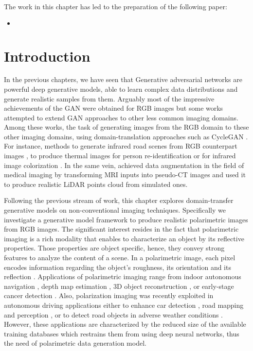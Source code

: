 \clearpage

The work in this chapter has led to the preparation of the following paper: 
\begin{itemize}
	\item {}
\end{itemize}

\setcounter{minitocdepth}{3}
\minitoc
\setcounter{minitocdepth}{2}

\section{Introduction}


In the previous chapters, we have seen that Generative  adversarial networks \citep{Goodfellow2014} are powerful deep generative models, able to learn complex data distributions and generate realistic samples from them. Arguably most of the impressive achievements of the \ac{GAN} were obtained for \ac{RGB} images but some works attempted to extend \ac{GAN} approaches to other less common imaging domains. Among these works, the task of generating images from the \ac{RGB} domain to these other imaging domains, using domain-translation approaches such as \ac{CycleGAN} \citep{Zhu2017a}. For instance, methods to generate infrared road scenes from \ac{RGB} counterpart images \citep{Zhang2018b}, to produce thermal images for person re-identification \citep{Kniaz2018} or for infrared image colorization \citep{Mehri2019}. In the same vein, \citet{Nie2017} achieved data augmentation in the field of medical imaging by transforming MRI inputs into pseudo-CT images and \citet{Sallab2019} used it to produce realistic \ac{LiDAR} points cloud from simulated ones. 

Following the previous stream of work, this chapter explores domain-transfer generative models on non-conventional imaging techniques. Specifically we investigate a  generative model framework to produce realistic polarimetric images from \ac{RGB} images.  The significant interest resides in the fact that polarimetric imaging is a rich modality that enables to characterize an object by its reflective properties. Those properties are object specific, hence, they convey strong features to analyze the content of a scene. In a polarimetric image, each pixel encodes information regarding the object's roughness, its orientation and its reflection \citep{Wolff1995}. Applications of polarimetric imaging range from indoor autonomous navigation \citep{Berger2017}, depth map estimation \citep{Zhu2019}, 3D object reconstruction \citep{Morel2006},  or early-stage cancer detection \citep{Rehbinder2016}. Also, polarization imaging was recently exploited in autonomous driving applications either to enhance car detection \citep{Fan2018}, road mapping and perception \citep{Aycock2017}, or to detect road objects in adverse weather conditions \citep{Blin2019}.  However, these  applications are characterized by the reduced size of the available training databases which restrains them from using deep neural networks, thus the need of polarimetric data generation model. 

